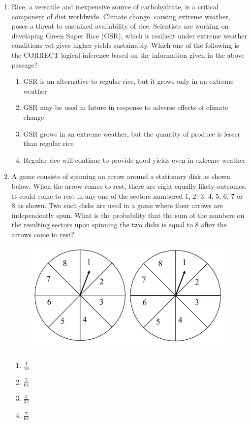 \documentclass[journal,12pt,onecolumn]{IEEEtran}
\theoremstyle{remark}
\begin{document}
\begin{enumerate}
\item Rice, a versatile and inexpensive source of carbohydrate, is a critical component of diet worldwide. Climate change, causing extreme weather, poses a threat to sustained availability of rice. Scientists are working on developing Green Super Rice (GSR), which is resilient under extreme weather conditions yet gives higher yields sustainably. Which one of the following is the CORRECT logical inference based on the information given in the above passage?

\hfill{}
\begin{enumerate}
\item GSR is an alternative to regular rice, but it grows only in an extreme weather
\item GSR may be used in future in response to adverse effects of climate change
\item GSR grows in an extreme weather, but the quantity of produce is lesser than regular rice
\item Regular rice will continue to provide good yields even in extreme weather
\end{enumerate}

\item A game consists of spinning an arrow around a stationary disk as shown below. When the arrow comes to rest, there are eight equally likely outcomes. It could come to rest in any one of the sectors numbered $1$, $2$, $3$, $4$, $5$, $6$, $7$ or $8$ as shown. Two such disks are used in a game where their arrows are independently spun. What is the probability that the sum of the numbers on the resulting sectors upon spinning the two disks is equal to $8$ after the arrows come to rest?

\hfill{}
\begin{figure}[H]
\includegraphics[width = 0.5\columnwidth]{q7}
\caption*{}
\label{fig:q7}
\end{figure}
\begin{enumerate}
\item $\frac{1}{16}$
\item $\frac{5}{64}$
\item $\frac{3}{32}$
\item $\frac{7}{64}$
\end{enumerate}


\end{enumerate}
\end{document}
